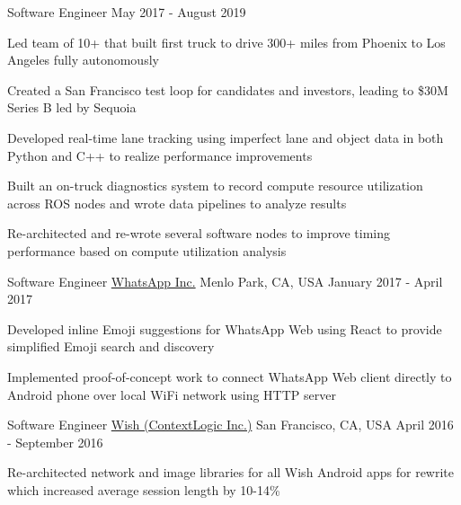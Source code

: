 \begin{center}
  \cvsubentry
    {Software Engineer}
    {May 2017 - August 2019}
    {
      \begin{cvitems}
        \item {Led team of 10+ that built first truck to drive 300+ miles from Phoenix to Los Angeles fully autonomously}
        \item {Created a San Francisco test loop for candidates and investors, leading to \$30M Series B led by Sequoia}
        \item {Developed real-time lane tracking using imperfect lane and object data in both Python and C++ to realize performance improvements}
        \item {Built an on-truck diagnostics system to record compute resource utilization across ROS nodes and wrote data pipelines to analyze results}
        \item {Re-architected and re-wrote several software nodes to improve timing performance based on compute utilization analysis}
      \end{cvitems} 
    }
\end{center}
\begin{center}
  \vspace{-2.7mm}
  \cventry
    {Software Engineer}
    {\href{http://web.whatsapp.com/}{WhatsApp Inc.}}
    {Menlo Park, CA, USA}
    {January 2017 - April 2017}
    {
      \begin{cvitems}
        \item {Developed inline Emoji suggestions for WhatsApp Web using React to provide simplified Emoji search and discovery}
        \item {Implemented proof-of-concept work to connect WhatsApp Web client directly to Android phone over local WiFi network using HTTP server}
      \end{cvitems}
    }
\end{center}
\begin{center}
  \vspace{-2.7mm}
  \cventry
    {Software Engineer}
    {\href{http://wish.com/mobile-apps}{Wish (ContextLogic Inc.)}}
    {San Francisco, CA, USA}
    {April 2016 - September 2016}
    {
      \begin{cvitems}
        \item {Re-architected network and image libraries for all Wish Android apps for rewrite which increased average session length by 10-14\%}
      \end{cvitems}
    }
\end{center}
